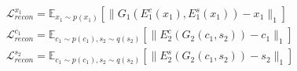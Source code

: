 \begin{equation}
\begin{split}
\mathcal{L}_{recon}^{x_1} = \mathbb{E}_{x_1 \sim p(x_1)}[\parallel G_1(E_1^c(x_1),E_1^s(x_1))-x_1\parallel_1] \\
\mathcal{L}_{recon}^{c_1} = \mathbb{E}_{c_1 \sim p(c_1), s_2 \sim q(s_2)}[\parallel E_2^c(G_2(c_1,s_2))-c_1\parallel_1] \\
\mathcal{L}_{recon}^{s_2} = \mathbb{E}_{c_1 \sim p(c_1), s_2 \sim q(s_2)}[\parallel E_2^s(G_2(c_1,s_2))-s_2\parallel_1]
\end{split}
\label{munit}
\end{equation}








